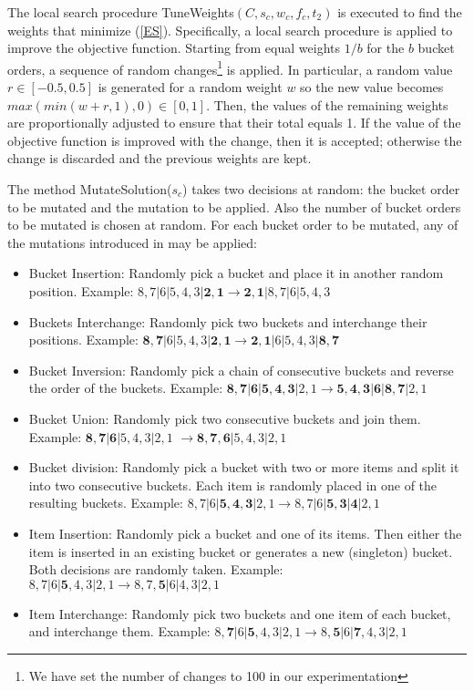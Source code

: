 \documentclass[preprint,12pt]{article}
\theoremstyle{definition}
\theoremstyle{remark}
\theoremstyle{example} %
\begin{document}
The local search procedure {\sc TuneWeights}$(C,s_c,w_c,f_c,t_2)$ is executed to find the weights  that minimize (\ref{ES}).  Specifically, a local search procedure is applied to improve the objective function. Starting from equal weights $1/b$ for  the $b$ bucket orders, a sequence of random changes\footnote{We have set the number of changes to 100 in our experimentation} is applied. In particular, a random value $r \in [-0.5,0.5]$ is generated for a random weight $w$ so the new value becomes  
$max(min(w+r,1),0)\in [0,1]$. Then, the values of the remaining weights are proportionally adjusted to ensure that their total equals 1. If the value of the objective function is improved with  the change, then it is accepted; otherwise the change is discarded and the previous weights are kept.

The method {\sc MutateSolution}($s_c$) takes two decisions at random: the bucket order to be mutated and the mutation to be applied. Also the number of bucket orders  to be mutated is chosen at random. For  each bucket order to be mutated, any of the mutations introduced in \cite{Aledo2018-ES-EJOR}  may be applied: 
\begin{itemize}
\item Bucket Insertion: Randomly pick a bucket and place it in another random position.
Example: $8,7|6|5,4,3|\mathbf{2,1}\longrightarrow\mathbf{2,1}|8,7|6|5,4,3$
\item Buckets Interchange: Randomly pick two buckets and interchange their positions.
Example: $\mathbf{8,7}|6|5,4,3|\mathbf{2,1}\longrightarrow\mathbf{2,1}|6|5,4,3|\mathbf{8,7}$
\item Bucket Inversion: Randomly pick a chain of consecutive buckets and reverse the order of the buckets.
Example: $\mathbf{8,7|6|5,4,3|}2,1\longrightarrow\mathbf{5,4,3|6|8,7|}2,1$
\item Bucket Union: Randomly pick two consecutive buckets and join them.
Example: $\mathbf{8,7|6}|5,4,3|2,1$ $\longrightarrow \mathbf{8,7,6}|5,4,3|2,1$
\item Bucket division: Randomly pick a bucket with two or more items and split it into two consecutive buckets. Each item is randomly placed in one of the resulting buckets.
Example: $8,7|6|\mathbf{5,4,3}|2,1\longrightarrow
8,7|6|\mathbf{5,3|4}|2,1$
\item Item Insertion: Randomly pick a bucket and one of its items. Then either the item is inserted in an existing bucket or generates a new (singleton) bucket. Both decisions are randomly taken.
Example: $8,7|6|\mathbf{5},4,3|2,1\longrightarrow
8,7,\mathbf{5}|6|4,3|2,1$
\item Item Interchange: Randomly pick two buckets and one item of each bucket, and interchange them. Example:
$8,\mathbf{7}|6|\mathbf{5},4,3|2,1\longrightarrow
8,\mathbf{5}|6|\mathbf{7},4,3|2,1$
\end{itemize}
\end{document}
